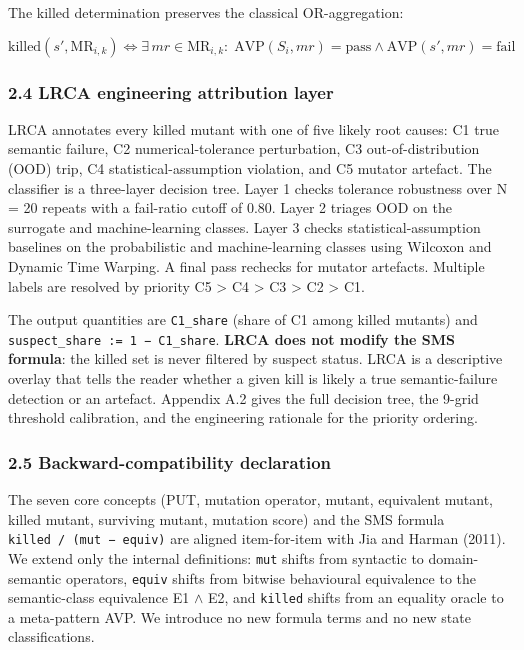 \documentclass[review,12pt,authoryear]{elsarticle}
\begin{document}
The killed determination preserves the classical OR-aggregation:

\[ \mathrm{killed}(s', \mathrm{MR}_{i,k}) \iff \exists\,mr \in \mathrm{MR}_{i,k}:\; \mathrm{AVP}(S_i, mr) = \text{pass} \wedge \mathrm{AVP}(s', mr) = \text{fail} \]

\subsubsection{2.4 LRCA engineering attribution layer}\label{lrca-engineering-attribution-layer-descriptive-not-in-sms}

LRCA annotates every killed mutant with one of five likely root causes:
C1 true semantic failure, C2 numerical-tolerance perturbation, C3
out-of-distribution (OOD) trip, C4 statistical-assumption violation, and
C5 mutator artefact. The classifier is a three-layer decision tree.
Layer 1 checks tolerance robustness over N = 20 repeats with a
fail-ratio cutoff of 0.80. Layer 2 triages OOD on the surrogate and
machine-learning classes. Layer 3 checks statistical-assumption
baselines on the probabilistic and machine-learning classes using
Wilcoxon and Dynamic Time Warping. A final pass rechecks for mutator
artefacts. Multiple labels are resolved by priority C5 \textgreater{} C4
\textgreater{} C3 \textgreater{} C2 \textgreater{} C1.

The output quantities are \texttt{C1\_share} (share of C1 among killed
mutants) and \texttt{suspect\_share\ :=\ 1\ −\ C1\_share}. \textbf{LRCA
does not modify the SMS formula}: the killed set is never filtered by
suspect status. LRCA is a descriptive overlay that tells the reader
whether a given kill is likely a true semantic-failure detection or an
artefact. Appendix A.2 gives the full decision tree, the 9-grid
threshold calibration, and the engineering rationale for the priority
ordering.

\subsubsection{2.5 Backward-compatibility declaration}\label{backward-compatibility-declaration}

The seven core concepts (PUT, mutation operator, mutant, equivalent
mutant, killed mutant, surviving mutant, mutation score) and the SMS
formula
\texttt{\textbar{}killed\textbar{}\ /\ (\textbar{}mut\textbar{}\ −\ \textbar{}equiv\textbar{})}
are aligned item-for-item with Jia and Harman (2011). We extend only the
internal definitions: \texttt{mut} shifts from syntactic to
domain-semantic operators, \texttt{equiv} shifts from bitwise
behavioural equivalence to the semantic-class equivalence E1 $\wedge$ E2, and
\texttt{killed} shifts from an equality oracle to a meta-pattern AVP. We
introduce no new formula terms and no new state classifications.
\end{document}
